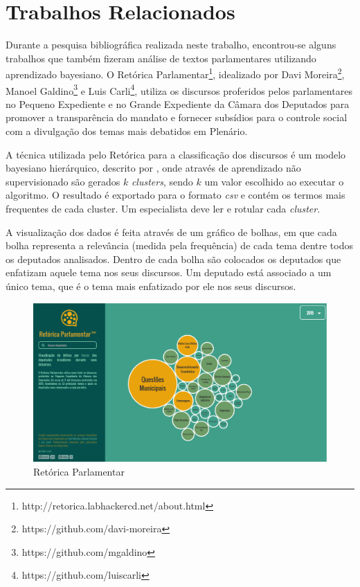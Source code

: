 \section{Trabalhos Relacionados}

Durante a pesquisa bibliográfica realizada neste trabalho, encontrou-se alguns trabalhos que também fizeram análise de textos parlamentares utilizando aprendizado bayesiano. O Retórica Parlamentar\footnote{http://retorica.labhackercd.net/about.html}, idealizado por Davi Moreira\footnote{https://github.com/davi-moreira}, Manoel Galdino\footnote{https://github.com/mgaldino} e Luis Carli\footnote{https://github.com/luiscarli}, utiliza os discursos proferidos pelos parlamentares no Pequeno Expediente e no Grande Expediente da Câmara dos Deputados para promover a transparência do mandato e fornecer subsídios para o controle social com a divulgação dos temas mais debatidos em Plenário.

A técnica utilizada pelo Retórica para a classificação dos discursos é um modelo bayesiano hierárquico, descrito por , onde através de aprendizado não supervisionado são gerados \(k\) \textit{clusters}, sendo \(k\) um valor escolhido ao executar o algoritmo. O resultado é exportado para o formato \textit{csv} e contém os termos mais frequentes de cada cluster. Um especialista deve ler e rotular cada \textit{cluster}.

A visualização dos dados é feita através de um gráfico de bolhas, em que cada bolha representa a relevância (medida pela frequência) de cada tema dentre todos os deputados analisados. Dentro de cada bolha são colocados os deputados que enfatizam aquele tema nos seus discursos. Um deputado está associado a um único tema, que é o tema mais enfatizado por ele nos seus discursos.

\begin{figure}[h]
    \centering
    \includegraphics[scale=0.3]{figuras/retorica.eps}
    \caption{Retórica Parlamentar}
\end{figure}
